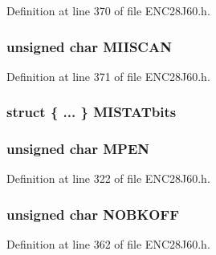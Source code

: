 Definition at line 370 of file E\+N\+C28\+J60.\+h.

\hypertarget{union___r_e_g_ac3842ce965743a2ad2935925ffc140c2}{}
\subsubsection[{M\+I\+I\+S\+C\+A\+N}]{\setlength{\rightskip}{0pt plus 5cm}unsigned {\bf char} M\+I\+I\+S\+C\+A\+N}\label{union___r_e_g_ac3842ce965743a2ad2935925ffc140c2}


Definition at line 371 of file E\+N\+C28\+J60.\+h.

\hypertarget{union___r_e_g_af0b39db147b97da5bd9f55c679c1a491}{}
\subsubsection[{M\+I\+S\+T\+A\+Tbits}]{\setlength{\rightskip}{0pt plus 5cm}struct \{ ... \}   M\+I\+S\+T\+A\+Tbits}\label{union___r_e_g_af0b39db147b97da5bd9f55c679c1a491}
\hypertarget{union___r_e_g_afaeb946a94c079f87dfb051a54452254}{}
\subsubsection[{M\+P\+E\+N}]{\setlength{\rightskip}{0pt plus 5cm}unsigned {\bf char} M\+P\+E\+N}\label{union___r_e_g_afaeb946a94c079f87dfb051a54452254}


Definition at line 322 of file E\+N\+C28\+J60.\+h.

\hypertarget{union___r_e_g_aa585427f3297279418ba0bb925ba9713}{}
\subsubsection[{N\+O\+B\+K\+O\+F\+F}]{\setlength{\rightskip}{0pt plus 5cm}unsigned {\bf char} N\+O\+B\+K\+O\+F\+F}\label{union___r_e_g_aa585427f3297279418ba0bb925ba9713}


Definition at line 362 of file E\+N\+C28\+J60.\+h.

